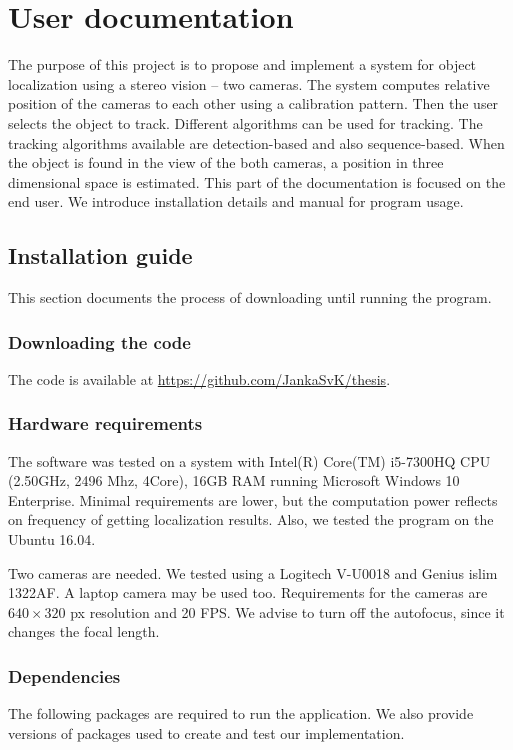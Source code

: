 \chapter{User documentation}
The purpose of this project is to propose and implement a system for object
localization using a stereo vision -- two cameras. The system computes relative
position of the cameras to each other using a calibration pattern. Then the user
selects the object to track. Different algorithms can be used for tracking.
The tracking algorithms available are detection-based and also sequence-based.
When the object is found in the view of the both cameras, a position in three
dimensional space is estimated. 
This part of the documentation is focused on the end user. We introduce
installation details and manual for program usage.

\section{Installation guide}
This section documents the process of downloading until running the program.

\subsection{Downloading the code}
The code is available at \url{https://github.com/JankaSvK/thesis}.

\subsection{Hardware requirements}
The software was tested on a system with Intel(R) Core(TM) i5-7300HQ CPU
(2.50GHz, 2496 Mhz, 4Core), 16GB RAM running Microsoft Windows 10 Enterprise.
Minimal requirements are lower, but the computation power reflects on frequency
of getting localization results. Also, we tested the program on the Ubuntu
16.04.

Two cameras are needed. We tested using a Logitech V-U0018 and Genius
islim 1322AF. A laptop camera may be used too. Requirements for the cameras
are $640\times320$ px resolution and 20 FPS. We advise to turn off the
autofocus, since it changes the focal length.

\subsection{Dependencies}
The following packages are required to run the application. We also provide
versions of packages used to create and test our implementation.

